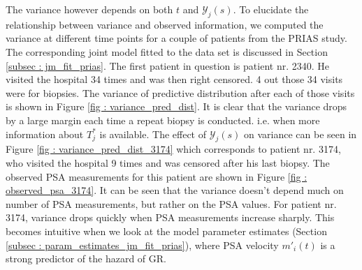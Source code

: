 The variance however depends on both $t$ and $\mathcal{Y}_j(s)$. To elucidate the relationship between variance and observed information, we computed the variance at different time points for a couple of patients from the PRIAS study. The corresponding joint model fitted to the data set is discussed in Section \ref{subsec : jm_fit_prias}. The first patient in question is patient nr. 2340. He visited the hospital 34 times and was then right censored. 4 out those 34 visits were for biopsies. The variance of predictive distribution after each of those visits is shown in Figure \ref{fig : variance_pred_dist}. It is clear that the variance drops by a large margin each time a repeat biopsy is conducted. i.e. when more information about $T^*_j$ is available. The effect of $\mathcal{Y}_j(s)$ on variance can be seen in Figure \ref{fig : variance_pred_dist_3174} which corresponds to patient nr. 3174, who visited the hospital 9 times and was censored after his last biopsy. The observed PSA measurements for this patient are shown in Figure \ref{fig : observed_psa_3174}. It can be seen that the variance doesn't depend much on number of PSA measurements, but rather on the PSA values. For patient nr. 3174, variance drops quickly when PSA measurements increase sharply.  This becomes intuitive when we look at the model parameter estimates (Section \ref{subsec : param_estimates_jm_fit_prias}), where PSA velocity $m'_i(t)$ is a strong predictor of the hazard of GR.


